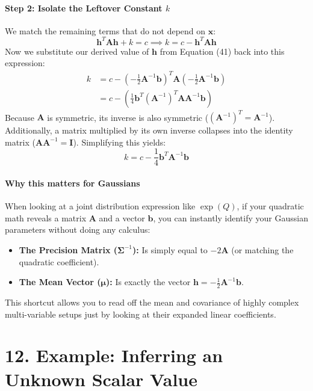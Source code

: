 \documentclass{article}
\begin{document}
\paragraph{Step 2: Isolate the Leftover Constant $k$}
We match the remaining terms that do not depend on $\mathbf{x}$:
\begin{equation*}
\mathbf{h}^T\mathbf{A}\mathbf{h} + k = c \implies k = c - \mathbf{h}^T\mathbf{A}\mathbf{h}
\end{equation*}
Now we substitute our derived value of $\mathbf{h}$ from Equation (41) back into this expression:
\begin{align*}
k &= c - \left(-\frac{1}{2}\mathbf{A}^{-1}\mathbf{b}\right)^T \mathbf{A} \left(-\frac{1}{2}\mathbf{A}^{-1}\mathbf{b}\right) \\
&= c - \left(\frac{1}{4}\mathbf{b}^T(\mathbf{A}^{-1})^T\mathbf{A}\mathbf{A}^{-1}\mathbf{b}\right)
\end{align*}
Because $\mathbf{A}$ is symmetric, its inverse is also symmetric ($(\mathbf{A}^{-1})^T = \mathbf{A}^{-1}$). Additionally, a matrix multiplied by its own inverse collapses into the identity matrix ($\mathbf{A}\mathbf{A}^{-1} = \mathbf{I}$). Simplifying this yields:
\begin{equation}
k = c - \frac{1}{4}\mathbf{b}^T\mathbf{A}^{-1}\mathbf{b} \tag{42}
\end{equation}

\paragraph{Why this matters for Gaussians}
When looking at a joint distribution expression like $\exp(Q)$, if your quadratic math reveals a matrix $\mathbf{A}$ and a vector $\mathbf{b}$, you can instantly identify your Gaussian parameters without doing any calculus:
\begin{itemize}
    \item \textbf{The Precision Matrix ($\boldsymbol{\Sigma}^{-1}$):} Is simply equal to $-2\mathbf{A}$ (or matching the quadratic coefficient).
    \item \textbf{The Mean Vector ($\boldsymbol{\mu}$):} Is exactly the vector $\mathbf{h} = -\frac{1}{2}\mathbf{A}^{-1}\mathbf{b}$.
\end{itemize}
This shortcut allows you to read off the mean and covariance of highly complex multi-variable setups just by looking at their expanded linear coefficients.

\section*{12. Example: Inferring an Unknown Scalar Value}
\end{document}
